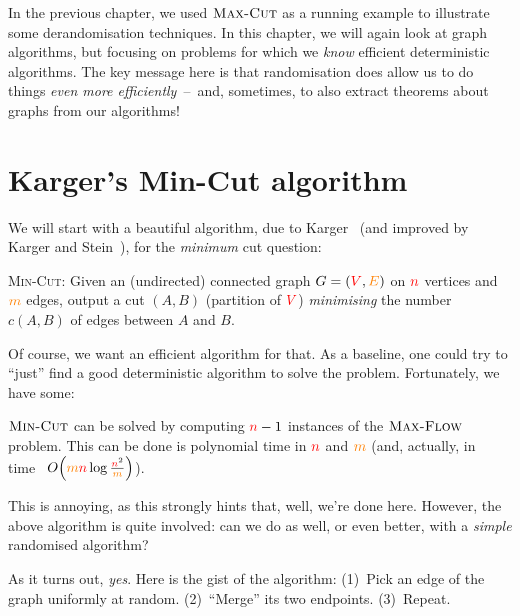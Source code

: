 In the previous chapter, we used $\textsc{Max-Cut}$ as a running example to illustrate some derandomisation techniques. In this chapter, we will again look at graph algorithms, but focusing on problems for which we \emph{know} efficient deterministic algorithms. The key message here is that randomisation does allow us to do things \emph{even more efficiently}~--~and, sometimes, to also extract theorems about graphs from our algorithms!

\section{Karger's Min-Cut algorithm}
We will start with a beautiful algorithm, due to Karger~\cite{Karger93} (and improved by Karger and Stein~\cite{KargerS93}), for the \emph{minimum} cut question:
\begin{framed}
\noindent \textsc{Min-Cut}: Given an (undirected) connected graph $G=(\textcolor{red}{V},\textcolor{orange}{E})$ on $\textcolor{red}{n}$ vertices and $\textcolor{orange}{m}$ edges, output a cut $(A,B)$ (partition of $\textcolor{red}{V}$) \emph{minimising} the number $c(A,B)$ of edges between $A$ and $B$.
\end{framed}
Of course, we want an efficient algorithm for that. As a baseline, one could try to ``just'' find a good deterministic algorithm to solve the problem. Fortunately, we have some:
\begin{fact}
    $\textsc{Min-Cut}$ can be solved by computing $\textcolor{red}{n}-1$ instances of the $\textsc{Max-Flow}$ problem. This can be done is polynomial time in $\textcolor{red}{n}$ and $\textcolor{orange}{m}$ (and, actually, in time~\cite{HaoO94} $\bigO{\orange{m}\red{n}\log\frac{\red{n}^2}{\orange{m}}}$).
\end{fact}
This is annoying, as this strongly hints that, well, we're done here. However, the above algorithm is quite involved: can we do as well, or even better, with a \emph{simple} randomised algorithm?

As it turns out, \emph{yes}. Here is the gist of the algorithm: (1)~Pick an edge of the graph uniformly at random. (2)~``Merge'' its two endpoints. (3)~Repeat.

